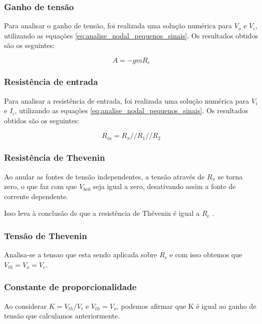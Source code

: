 \subsubsection{Ganho de tensão}

Para analisar o ganho de tensão, foi realizada uma solução numérica para $V_o$ e $V_i$, utilizando as equações \ref*{eq:analise_nodal_pequenos_sinais}. Os resultados obtidos são os seguintes:

\begin{equation}
    A = - gm R_c
\end{equation}

\subsubsection{Resistência de entrada}

Para analisar a resistência de entrada, foi realizada uma solução numérica para $V_i$ e $I_i$, utilizando as equações \ref*{eq:analise_nodal_pequenos_sinais}. Os resultados obtidos são os seguintes:

\begin{equation}
    R_{in} = R_{\pi}  //  R_1  //  R_2
\end{equation}

\subsubsection{Resistência de Thevenin}
\label{sec:resistencia_thevenin}

Ao anular as fontes de tensão independentes, a tensão através de $R_{\pi}$ se torna zero, o que faz com que $V_{be0}$ seja igual a zero, desativando assim a fonte de corrente dependente.

Isso leva à conclusão de que a resistência de Thévenin é igual a $R_c$
.

\subsubsection{Tensão de Thevenin}
\label{sec:tensao_thevenin}

Analisa-se a tensao que esta sendo aplicada sobre $R_c$ e com isso obtemos que $V_{th} = V_o = V_c$.

\subsubsection{Constante de proporcionalidade}

Ao considerar $K = V_{th} / V_i$ e $V_{th} = V_o$, podemos afirmar que K é igual ao ganho de tensão que calculamos anteriormente.

